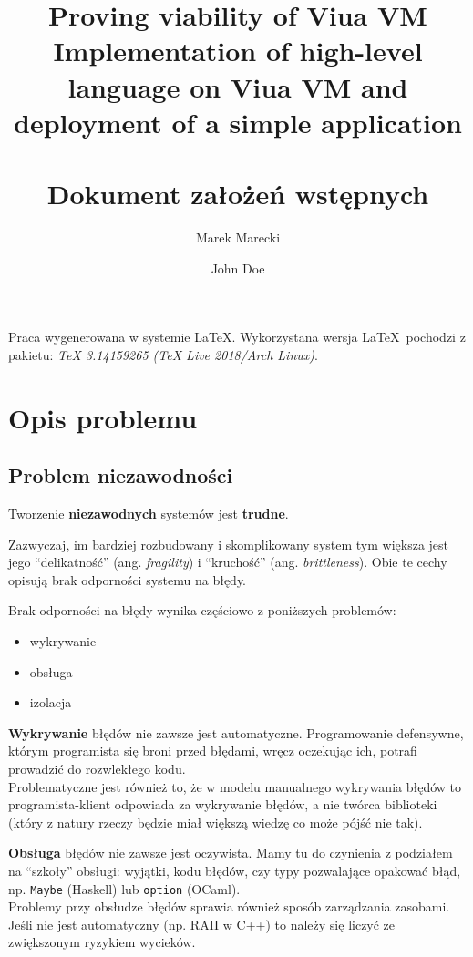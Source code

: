 \documentclass[11pt,oneside,a4paper,titlepage,onecolumn]{article}
\author{Marek Marecki \and John Doe}
\title{%
    Proving viability of Viua VM \\
    \large Implementation of high-level language on Viua VM and\\
    deployment of a simple application \\
    ~\\
    Dokument założeń wstępnych}
\begin{document}
\maketitle

Praca wygenerowana w systemie \LaTeX.
Wykorzystana wersja \LaTeX~pochodzi z pakietu: \emph{TeX 3.14159265 (TeX Live 2018/Arch Linux)}.

\tableofcontents

\newpage

\section{Opis problemu}
\label{opis_problemu}

\subsection{Problem niezawodności}

\begin{center}
    Tworzenie \textbf{niezawodnych} systemów jest \textbf{trudne}.
\end{center}

Zazwyczaj, im bardziej rozbudowany i skomplikowany system tym większa jest
jego ``delikatność'' (ang. \emph{fragility}) i ``kruchość'' (ang. \emph{brittleness}).
Obie te cechy opisują brak odporności systemu na błędy.

Brak odporności na błędy wynika częściowo z poniższych problemów:

\begin{itemize}
\item wykrywanie
\item obsługa
\item izolacja
\end{itemize}

\textbf{Wykrywanie} błędów nie zawsze jest automatyczne. Programowanie defensywne, którym
programista się broni przed błędami, wręcz oczekując ich, potrafi prowadzić do rozwlekłego kodu. \\
Problematyczne jest również to, że w modelu manualnego wykrywania błędów to programista-klient
odpowiada za wykrywanie błędów, a nie twórca biblioteki (który z natury rzeczy będzie miał większą
wiedzę co może pójść nie tak).

\textbf{Obsługa} błędów nie zawsze jest oczywista. Mamy tu do czynienia z podziałem na ``szkoły''
obsługi: wyjątki, kodu błędów, czy typy pozwalające opakować błąd, np. \texttt{Maybe} (Haskell) lub
\texttt{option} (OCaml). \\
Problemy przy obsłudze błędów sprawia również sposób zarządzania zasobami. Jeśli nie jest
automatyczny (np. RAII w C++) to należy się liczyć ze zwiększonym ryzykiem wycieków.
\end{document}

